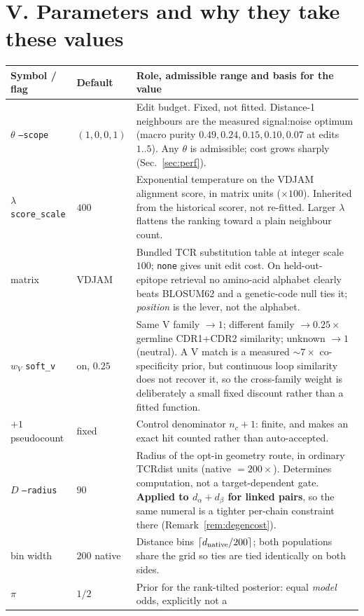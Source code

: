 \documentclass[10pt,a4paper]{article}
\theoremstyle{definition}
\newcommand{\code}[1]{\texttt{\small #1}}
\begin{document}
\part*{V. Parameters and why they take these values}
\label{sec:par}

\begin{center}\small
\begin{tabular}{@{}llp{86mm}@{}}
\toprule
Symbol / flag & Default & Role, admissible range and basis for the value\\
\midrule
$\theta$ \code{--scope} & $(1,0,0,1)$ &
Edit budget. Fixed, not fitted. Distance-1 neighbours are the measured signal:noise optimum (macro
purity $0.49,0.24,0.15,0.10,0.07$ at edits $1..5$). Any $\theta$ is admissible; cost grows sharply
(Sec.~\ref{sec:perf}).\\
$\lambda$ \code{score\_scale} & $400$ &
Exponential temperature on the VDJAM alignment score, in matrix units ($\times100$). Inherited from
the historical scorer, not re-fitted. Larger $\lambda$ flattens the ranking toward a plain
neighbour count.\\
matrix & VDJAM & Bundled TCR substitution table at integer scale $100$; \code{none} gives unit edit
cost. On held-out-epitope retrieval no amino-acid alphabet clearly beats BLOSUM62 and a genetic-code
null ties it; \emph{position} is the lever, not the alphabet.\\
$w_V$ \code{soft\_v} & on, $0.25$ &
Same V family $\to1$; different family $\to0.25\times$ germline CDR1+CDR2 similarity; unknown $\to1$
(neutral). A V match is a measured ${\sim}7\times$ co-specificity prior, but continuous loop
similarity does not recover it, so the cross-family weight is deliberately a small fixed discount
rather than a fitted function.\\
$+1$ pseudocount & fixed & Control denominator $n_c+1$: finite, and makes an exact
hit counted rather than auto-accepted.\\
$D$ \code{--radius} & $90$ &
Radius of the opt-in geometry route, in ordinary TCRdist units (native $=200\times$). Determines
computation, not a target-dependent gate. \textbf{Applied to $d_\alpha+d_\beta$ for linked pairs},
so the same numeral is a tighter per-chain constraint there (Remark~\ref{rem:degencost}).\\
bin width & $200$ native & Distance bins $\lceil d_{\rm native}/200\rceil$; both populations share
the grid so ties are tied identically on both sides.\\
$\pi$ & $1/2$ & Prior for the rank-tilted posterior: equal \emph{model} odds, explicitly not a

\end{tabular}
\end{center}
\end{document}
